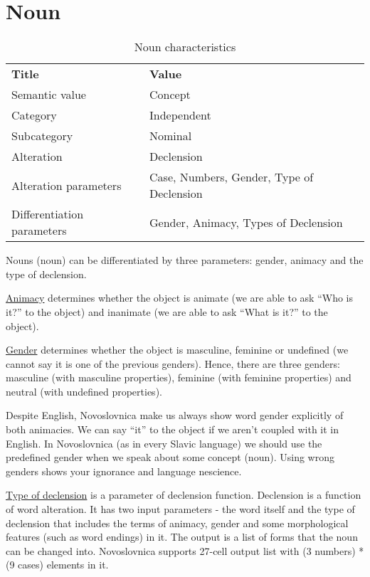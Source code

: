 \section{Noun}

\begin{table}[h]
	\caption{Noun characteristics}
	\begin{tabular}{lp{12em}}
		\textbf{Title}              & \textbf{Value}                            \\
		Semantic value              & Concept                                   \\
		Category                    & Independent                               \\
		Subcategory                 & Nominal                                   \\
		Alteration                  & Declension                                \\
		Alteration parameters       & Case, Numbers, Gender, Type of Declension \\
		Differentiation parameters  & Gender, Animacy, Types of  Declension                                  
	\end{tabular}
\end{table}



Nouns (\gls{noun}) can be differentiated by three parameters: gender, animacy and the type of declension.

\underline{Animacy} determines whether the object is animate (we are able to ask “Who is it?” to the object) and inanimate (we are able to ask “What is it?” to the object).

\underline{Gender} determines whether the object is masculine, feminine or undefined (we cannot say it is one of the previous genders). Hence, there are three genders: masculine (with masculine properties), feminine (with feminine properties) and neutral (with undefined properties).

Despite English, Novoslovnica make us always show word gender explicitly of both animacies. We can say “it” to the object if we aren’t coupled with it in English. In Novoslovnica (as in every Slavic language) we should use the predefined gender when we speak about some concept (noun). Using wrong genders shows your ignorance and language nescience.

\underline{Type of declension} is a parameter of declension function. Declension is a function of word alteration. It has two input parameters - the word itself and the type of declension that includes the terms of animacy, gender and some morphological features (such as word endings) in it. The output is a list of forms that the noun can be changed into. Novoslovnica supports 27-cell output list with (3 numbers) * (9 cases) elements in it.

